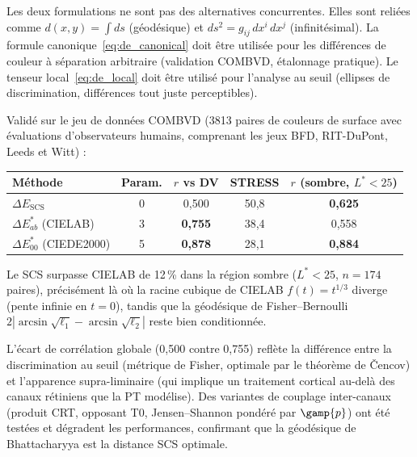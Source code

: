 \documentclass[12pt,a4paper]{article}
\begin{document}
\begin{remark}
Les deux formulations ne sont pas des alternatives concurrentes. Elles
sont reli\'ees comme $d(x,y) = \int ds$ (g\'eod\'esique) et
$ds^2 = g_{ij}\,dx^i\,dx^j$ (infinit\'esimal). La formule
canonique~\eqref{eq:de_canonical} doit \^etre utilis\'ee pour les
diff\'erences de couleur \`a s\'eparation arbitraire (validation COMBVD,
\'etalonnage pratique). Le tenseur local~\eqref{eq:de_local} doit
\^etre utilis\'e pour l'analyse au seuil (ellipses de discrimination,
diff\'erences tout juste perceptibles).
\end{remark}

\medskip

Valid\'e sur le jeu de donn\'ees COMBVD (3813 paires de couleurs de
surface avec \'evaluations d'observateurs humains, comprenant les jeux
BFD, RIT-DuPont, Leeds et Witt) :
\begin{center}
\begin{tabular}{lcccc}
\toprule
M\'ethode & Param. & $r$ vs DV & STRESS & $r$ (sombre, $L^*<25$) \\
\midrule
$\Delta E_{\mathrm{SCS}}$ & 0 & 0{,}500 & 50{,}8 & \textbf{0{,}625} \\
$\Delta E^*_{ab}$ (CIELAB) & 3 & \textbf{0{,}755} & 38{,}4 & 0{,}558 \\
$\Delta E^*_{00}$ (CIEDE2000) & 5 & \textbf{0{,}878} & 28{,}1 & \textbf{0{,}884} \\
\bottomrule
\end{tabular}
\end{center}
Le SCS surpasse CIELAB de 12\,\% dans la r\'egion sombre ($L^* < 25$,
$n = 174$ paires), pr\'ecis\'ement l\`a o\`u la racine cubique de
CIELAB $f(t) = t^{1/3}$ diverge (pente infinie en $t = 0$), tandis que
la g\'eod\'esique de Fisher--Bernoulli
$2|\arcsin\sqrt{\ell_1} - \arcsin\sqrt{\ell_2}|$ reste bien
conditionn\'ee.

L'\'ecart de corr\'elation globale (0{,}500 contre 0{,}755) refl\`ete
la diff\'erence entre la discrimination au seuil (m\'etrique de Fisher,
optimale par le th\'eor\`eme de \v{C}encov) et l'apparence
supra-liminaire (qui implique un traitement cortical au-del\`a des
canaux r\'etiniens que la PT mod\'elise). Des variantes de couplage
inter-canaux (produit CRT, opposant T0, Jensen--Shannon pond\'er\'e par
$\gamp{p}$) ont \'et\'e test\'ees et d\'egradent les performances,
confirmant que la g\'eod\'esique de Bhattacharyya est la distance
SCS optimale.

\end{document}
